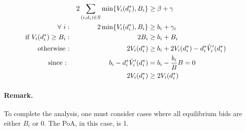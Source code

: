 \documentclass[11pt,a4paper]{article}
\begin{document}
\begin{align*}
	&& 2\sum_{(i,d_{i}) \in S} \min\{V_i(d_i^*), B_i \} &\ge \beta + \gamma\\
	\forall\ i : && 2 \min\{V_i(d_i^*), B_i \} &\ge b_i + \gamma_i \\
	\textnormal{if } V_i(d_i^*) \ge B_i : && 2B_i &\ge b_i + B_i\\
	\textnormal{otherwise :} && 2 V_i(d_i^*) &\ge b_i + 2 V_{i}(d^{*}_{i}) - d^{*}_{i} \hat{V}'_{i}(d^{*}_{i})\\
	\textnormal{since : } && b_i - d^{*}_{i} \hat{V}'_{i}(d^{*}_{i}) &= b_i - \frac{b_i}{B} B = 0\\
	&& 2 V_{i}(d^{*}_{i}) &\ge 2 V_{i}(d^{*}_{i})
\end{align*}

\paragraph{Remark.} To complete the analysis, one must consider cases where all equilibrium bids are either $B_{i}$ or 0. The PoA, in this case, is 1.
\end{document}
